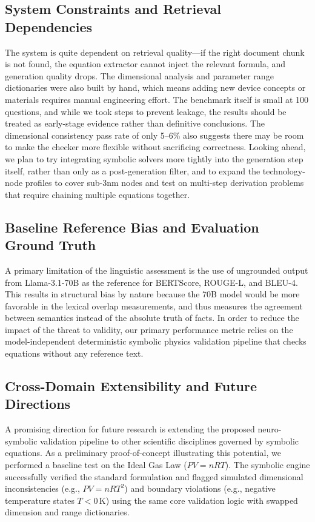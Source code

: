 \documentclass[a4paper,fleqn]{cas-sc}
\begin{document}
\subsection{System Constraints and Retrieval Dependencies}
The system is quite dependent on retrieval quality---if the right document chunk is not found, the equation extractor cannot inject the relevant formula, and generation quality drops. The dimensional analysis and parameter range dictionaries were also built by hand, which means adding new device concepts or materials requires manual engineering effort. The benchmark itself is small at 100 questions, and while we took steps to prevent leakage, the results should be treated as early-stage evidence rather than definitive conclusions. The dimensional consistency pass rate of only 5--6\% also suggests there may be room to make the checker more flexible without sacrificing correctness. Looking ahead, we plan to try integrating symbolic solvers more tightly into the generation step itself, rather than only as a post-generation filter, and to expand the technology-node profiles to cover sub-3nm nodes and test on multi-step derivation problems that require chaining multiple equations together.

\subsection{Baseline Reference Bias and Evaluation Ground Truth}
A primary limitation of the linguistic assessment is the use of ungrounded output from Llama-3.1-70B as the reference for BERTScore, ROUGE-L, and BLEU-4. This results in structural bias by nature because the 70B model would be more favorable in the lexical overlap measurements, and thus measures the agreement between semantics instead of the absolute truth of facts. In order to reduce the impact of the threat to validity, our primary performance metric relies on the model-independent deterministic symbolic physics validation pipeline that checks equations without any reference text.

\subsection{Cross-Domain Extensibility and Future Directions}
A promising direction for future research is extending the proposed neuro-symbolic validation pipeline to other scientific disciplines governed by symbolic equations. As a preliminary proof-of-concept illustrating this potential, we performed a baseline test on the Ideal Gas Law ($PV = nRT$). The symbolic engine successfully verified the standard formulation and flagged simulated dimensional inconsistencies (e.g., $PV = nRT^2$) and boundary violations (e.g., negative temperature states $T < 0$\,K) using the same core validation logic with swapped dimension and range dictionaries. 
\end{document}
